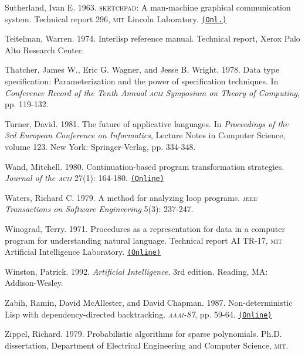 \documentclass[oneside]{book}
\newcommand{\acronym}[1]{\textsc{\MakeLowercase{#1}}}
\newcommand{\code}[1]{\texttt{#1}}
\begin{document}
 \label{Sutherland (1963)}
Sutherland, Ivan E.  1963.  \acronym{SKETCHPAD}: A man-machine graphical
communication system.  Technical report 296, \acronym{MIT} Lincoln Laboratory.
\href{http://citeseer.ist.psu.edu/viewdoc/summary?doi=10.1.1.10.4290}{\code{(Onl.)}}

 \label{Teitelman 1974}
Teitelman, Warren.  1974.  Interlisp reference manual.  Technical report, Xerox
Palo Alto Research Center.

 \label{Thatcher et al. 1978}
Thatcher, James W., Eric G. Wagner, and Jesse B. Wright. 1978.  Data type
specification: Parameterization and the power of specification techniques. In
\textit{Conference Record of the Tenth Annual \acronym{ACM} Symposium on Theory
of Computing}, pp. 119-132.

 \label{Turner 1981}
Turner, David.  1981.  The future of applicative languages.  In
\textit{Proceedings of the 3rd European Conference on Informatics}, Lecture Notes
in Computer Science, volume 123. New York: Springer-Verlag, pp.  334-348.

 \label{Wand 1980}
Wand, Mitchell.  1980.  Continuation-based program transformation strategies.
\textit{Journal of the \acronym{ACM}} 27(1): 164-180.
\href{http://citeseerx.ist.psu.edu/viewdoc/summary?doi=10.1.1.83.8567}{\code{(Online)}}

 \label{Waters (1979)}
Waters, Richard C.  1979.  A method for analyzing loop programs.
\textit{\acronym{IEEE} Transactions on Software Engineering} 5(3): 237-247.

Winograd, Terry.  1971.  Procedures as a representation for data in a computer
program for understanding natural language.  Technical report AI TR-17,
\acronym{MIT} Artificial Intelligence Laboratory.
\href{http://dspace.mit.edu/handle/1721.1/7095}{\code{(Online)}}

 \label{Winston 1992}
Winston, Patrick. 1992. \textit{Artificial Intelligence}.  3rd edition.  Reading,
MA: Addison-Wesley.

 \label{Zabih et al. 1987}
Zabih, Ramin, David McAllester, and David Chapman.  1987.  Non-deterministic
Lisp with dependency-directed backtracking.  \textit{\acronym{AAAI}-87},
pp. 59-64.
\href{http://www.aaai.org/Papers/AAAI/1987/AAAI87-011.pdf}{\code{(Online)}}

 \label{Zippel (1979)}
Zippel, Richard.  1979.  Probabilistic algorithms for sparse polynomials.
Ph.D. dissertation, Department of Electrical Engineering and Computer Science,
\acronym{MIT}.
\end{document}
